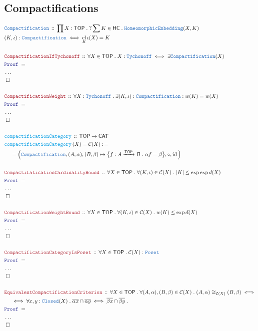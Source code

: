 \documentclass[12pt]{scrartcl}
\newcommand{\TYPE}[1]{\textcolor{NavyBlue}{\mathtt{#1}}}
\newcommand{\FUNC}[1]{\textcolor{Cerulean}{\mathtt{#1}}}
\newcommand{\LOGIC}[1]{\textcolor{Blue}{\mathtt{#1}}}
\newcommand{\THM}[1]{\textcolor{Maroon}{\mathtt{#1}}}
\renewcommand{\.}{\; . \;}
\newcommand{\de}{: \kern 0.1pc =}
\newcommand{\Act}[1]{\left( #1 \right)}
\newcommand{\Theorem}[2]{& \THM{#1} \, :: \, #2 \\ & \Proof = \\ }
\newcommand{\DeclareType}[2]{& \TYPE{#1} \, :: \, #2 \\}
\newcommand{\DefineType}[3]{& #1 : \TYPE{#2} \iff #3 \\}
\newcommand{\DeclareFunc}[2]{& \FUNC{#1} \, :: \, #2 \\}
\newcommand{\DefineNamedFunc}[4]{&  \FUNC{#1}\Act{#2} = #3 \de #4 \\}
\newcommand{\NewLine}{\\ & \kern 1pc}
\newcommand{\Page}[1]{ \begin{align*} #1 \end{align*}   }
\newcommand{\NoProof}{ & \ldots \\ \EndProof}
\DeclareMathOperator*{\id}{id}
\newcommand{\Arrow}{\xrightarrow}
\newcommand{\QED}{\; \square}
\newcommand{\EndProof}{& \QED \\}
\newcommand{\Proof}{\LOGIC{Proof} \; }
\newcommand{\C}{\mathcal{C}}
\newcommand{\CAT}{\mathsf{CAT}}
\DeclareMathOperator*{\cl}{cl}
\newcommand{\TOP}{\mathsf{TOP}}
\newcommand{\HC}{\mathsf{HC}}
\begin{document}
\subsection{Compactifications}
\Page{
	\DeclareType{Compactification}
	{
		\prod X : \TOP \.  
		?\sum  K \in \HC \.
		\TYPE{HomeomorphicEmbedding}(X,K) 
	}
	\DefineType{(K,\iota)}{Compactification}{\cl_K \iota(X) = K}
	\\
	\Theorem{CompactificationIfTychonoff}
	{
		\forall  X \in \TOP \.
		X : \TYPE{Tychonoff} \iff 
		\exists \TYPE{Compactification}(X)
	}
	\NoProof
	\\
	\Theorem{CompactificationWeight}
	{
		\forall X : \TYPE{Tychonoff} \.
		\exists (K,\iota) : \TYPE{Compactification} :
		w(K) = w(X)
	}
	\NoProof
	\\
	\DeclareFunc{compactificationCategory}{ \TOP \to \CAT}
	\DefineNamedFunc{compactificationCategory}{X}{\C(X)} 
	{
		\NewLine = 
		\Big( \TYPE{Compactification},(A,\alpha),(B,\beta) \mapsto \big\{ f : A \Arrow{\TOP} B \. 
		\alpha f = \beta \big\}, \circ, \id \Big)
	}
	\\
	\Theorem{CompactifaticationCardinalityBound}
	{
		\forall X \in \TOP \. \forall (K,\iota) \in \C(X) \.  |K| \le \exp \exp d(X) 
	}
	\NoProof
	\\
	\Theorem{CompactificationWeightBound}
	{
		\forall X \in \TOP \. \forall (K,\iota) \in \C(X) \. w(K) \le \exp d(X)
	}
	\NoProof
	\\
	\Theorem{CompactificationCategoryIsPoset}{\forall X \in \TOP \. \C(X) : \TYPE{Poset}}
	\NoProof
	\\
	\Theorem{EquivalentCompactificationCriterion}
	{
		\forall X \in \TOP \. 
		\forall (A,\alpha), (B,\beta) \in \C(X) \.
		(A,\alpha) \cong_{\C(X)} (B,\beta) \iff \NewLine \iff
		\forall x,y : \TYPE{Closed}(X) \.
		\overline{\alpha x} \cap \overline{\alpha y} 
		\iff
		\overline{\beta x} \cap \overline{\beta y} \.
	}
	\NoProof
}
\end{document}
